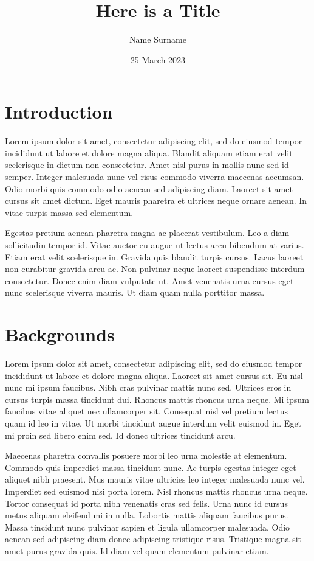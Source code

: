 \documentclass{article}
\title{Here is a Title}
\author{Name Surname}
\date{25 March 2023}
\begin{document}
\maketitle


\section {Introduction}
Lorem ipsum dolor sit amet, consectetur adipiscing elit, sed do eiusmod tempor incididunt ut labore et dolore magna aliqua. Blandit aliquam etiam erat velit scelerisque in dictum non consectetur. Amet nisl purus in mollis nunc sed id semper. Integer malesuada nunc vel risus commodo viverra maecenas accumsan. Odio morbi quis commodo odio aenean sed adipiscing diam. Laoreet sit amet cursus sit amet dictum. Eget mauris pharetra et ultrices neque ornare aenean. In vitae turpis massa sed elementum.

Egestas pretium aenean pharetra magna ac placerat vestibulum. Leo a diam sollicitudin tempor id. Vitae auctor eu augue ut lectus arcu bibendum at varius. Etiam erat velit scelerisque in. Gravida quis blandit turpis cursus. Lacus laoreet non curabitur gravida arcu ac. Non pulvinar neque laoreet suspendisse interdum consectetur. Donec enim diam vulputate ut. Amet venenatis urna cursus eget nunc scelerisque viverra mauris. Ut diam quam nulla porttitor massa.

\section{Backgrounds}

Lorem ipsum dolor sit amet, consectetur adipiscing elit, sed do eiusmod tempor incididunt ut labore et dolore magna aliqua. Laoreet sit amet cursus sit. Eu nisl nunc mi ipsum faucibus. Nibh cras pulvinar mattis nunc sed. Ultrices eros in cursus turpis massa tincidunt dui. Rhoncus mattis rhoncus urna neque. Mi ipsum faucibus vitae aliquet nec ullamcorper sit. Consequat nisl vel pretium lectus quam id leo in vitae. Ut morbi tincidunt augue interdum velit euismod in. Eget mi proin sed libero enim sed. Id donec ultrices tincidunt arcu.

Maecenas pharetra convallis posuere morbi leo urna molestie at elementum. Commodo quis imperdiet massa tincidunt nunc. Ac turpis egestas integer eget aliquet nibh praesent. Mus mauris vitae ultricies leo integer malesuada nunc vel. Imperdiet sed euismod nisi porta lorem. Nisl rhoncus mattis rhoncus urna neque. Tortor consequat id porta nibh venenatis cras sed felis. Urna nunc id cursus metus aliquam eleifend mi in nulla. Lobortis mattis aliquam faucibus purus. Massa tincidunt nunc pulvinar sapien et ligula ullamcorper malesuada. Odio aenean sed adipiscing diam donec adipiscing tristique risus. Tristique magna sit amet purus gravida quis. Id diam vel quam elementum pulvinar etiam.
\end{document}
